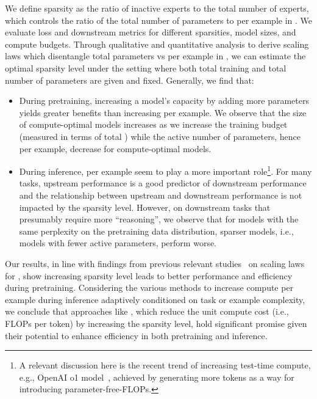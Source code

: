  
We define sparsity as the ratio of inactive experts to the total number of experts, which controls the ratio of the total number of parameters to \flops per example in \moes. We evaluate loss and downstream metrics for different sparsities, model sizes, and compute budgets.
Through qualitative and quantitative analysis to derive scaling laws which disentangle total parameters vs \flops per example in \moes, we can estimate the optimal sparsity level under the setting where both total training \flops and total number of parameters are given and fixed. Generally, we find that:
\begin{itemize}

\item During pretraining, increasing a model’s capacity by adding more parameters yields greater benefits than increasing \flops per example. We observe that the size of compute-optimal models increases as we increase the training budget (measured in terms of total \flops) while the active number of parameters, hence \flops per example, decrease for compute-optimal models.

\item During inference, \flops per example seem to play a more important role\footnote{A relevant discussion here is the recent trend of increasing test-time compute, e.g., OpenAI o1 model~\citep{openai2024openai}, achieved by generating more tokens as a way for introducing parameter-free-FLOPs.}.
For many tasks, upstream performance is a good predictor of downstream performance and the relationship between upstream and downstream performance is not impacted by the sparsity level. However, on downstream tasks that presumably require more ``reasoning'', we observe that for models with the same perplexity on the pretraining data distribution, sparser models, i.e., models with fewer active parameters, perform worse. 
\end{itemize}


Our results, in line with findings from previous relevant studies~\citep{ludziejewski2024scaling,he2024mixture} on scaling laws for \moes, show increasing sparsity level leads to better performance and efficiency during pretraining. 
Considering the various methods to increase compute per example during inference adaptively conditioned on task or example complexity, we conclude that approaches like \moes, which reduce the unit compute cost (i.e., FLOPs per token) by increasing the sparsity level, hold significant promise given their potential to enhance efficiency in both pretraining and inference.
